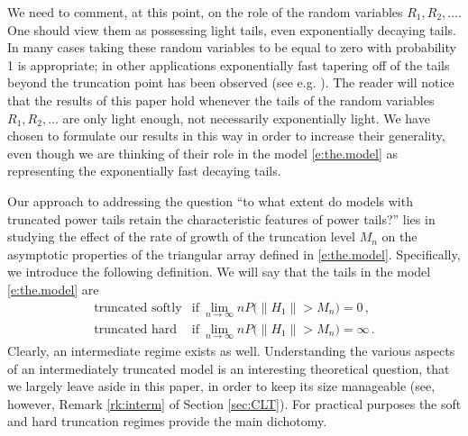 \documentclass[11pt]{amsart}
\numberwithin{equation}{section}
\begin{document}
We need to comment, at this point, on the role of the random variables
$R_1,R_2,\ldots$. One should view them as possessing light tails, even
exponentially decaying tails. In many cases taking these random
variables to be equal to zero with probability 1 is appropriate; in
other applications exponentially fast tapering off of the tails beyond
the truncation point has
been observed (see e.g. \cite{hong:rhee:kim:lee:chong:2008}). The
reader will notice that the results of this paper hold whenever the
tails of the random variables
$R_1,R_2,\ldots$ are only light enough, not necessarily exponentially
light. We have chosen to formulate our results in this way in order
to increase their generality, even though we are thinking of their
role in the model \eqref{e:the.model} as representing the
exponentially fast decaying tails.

Our approach to addressing the question ``to what extent do
models with truncated power tails retain the characteristic
features of power tails?'' lies in studying the effect of the
rate of growth of the truncation level $M_n$ on the asymptotic
properties of the triangular array defined in
\eqref{e:the.model}. Specifically, we introduce the following
definition. We will say that the tails in the model
\eqref{e:the.model} are
\begin{equation} \label{e:regimes}
\begin{array}{ll}
\text{truncated softly} & \text{if} \ \lim_{n\to\infty}nP\bigl( \|
H_1\|>M_n\bigr) = 0\,,\\
\text{truncated hard} & \text{if} \ \lim_{n\to\infty}nP\bigl( \|
H_1\|>M_n\bigr) = \infty\,.
\end{array}
\end{equation}
Clearly, an intermediate regime exists as well. Understanding the
various aspects of an intermediately truncated model is an interesting
theoretical question, that we largely leave aside in this paper, in
order to keep its size manageable (see, however, Remark
\ref{rk:interm} of Section \ref{sec:CLT}). For practical purposes the
soft and hard truncation regimes provide the main dichotomy. 
\end{document}

